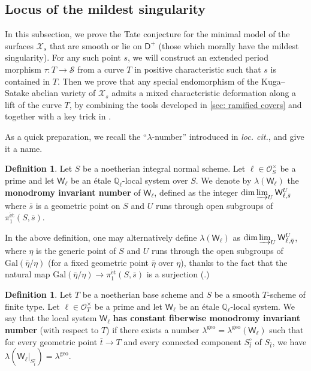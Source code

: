 \documentclass[11pt, letterpaper]{amsart}
\theoremstyle{plain}
\theoremstyle{definition}
\newtheorem{definition}[theorem]{Definition}
\newcommand{\IQ}{\mathbb{Q}}
\newcommand{\<}{\langle}
\renewcommand{\>}{\rangle}
\newcommand{\sO}{\mathcal{O}}
\newcommand{\Gal}{\mathrm{Gal}}
\newcommand{\et}{\mathrm{{\acute{e}}t}}
\newcommand{\shS}{\mathscr{S}}
\newcommand{\sfD}{\mathsf{D}}
\newcommand{\sX}{\mathcal{X}}
\newcommand{\sfW}{\mathsf{W}}
\newcommand{\geo}{{\mathrm{geo}}}
\begin{document}
\subsection{Locus of the mildest singularity}
In this subsection, we prove the Tate conjecture for the minimal model of the surfaces $\sX_s$ that are smooth or lie on $\sfD^+$ (those which morally have the mildest singularity).
For any such point $s$, we will construct an extended period morphism $\tau:T\to \shS$ from a curve $T$ in positive characteristic such that $s$ is contained in $T$.
Then we prove that any special endomorphism of the Kuga--Satake abelian variety of $\sX_s$ admits a mixed characteristic deformation along a lift of the curve $T$, by combining the tools developed in \cref{sec: ramified covers} and  together with a key trick in \cite{HYZ}.

As a quick preparation, we recall the ``$\lambda$-number'' introduced in \textit{loc. cit.}, and give it a name. 
\begin{definition}
\label{def: lambda number}
    Let $S$ be a noetherian integral normal scheme. 
    Let $\ell \in \sO_S^\times$ be a prime and let $\sfW_\ell$ be an \'etale $\IQ_\ell$-local system over $S$. 
    We denote by $\lambda(\sfW_\ell)$ the \textbf{monodromy invariant number} of $\sfW_\ell$, defined as the integer $\dim \varinjlim_U \sfW_{\ell, \bar{s}}^{U}$ where $\bar{s}$ is a geometric point on $S$ and $U$ runs through open subgroups of $\pi_1^\et(S, \bar{s})$.
\end{definition}
In the above definition, one may alternatively define $\lambda(\sfW_\ell)$ as $\dim \varinjlim_U \sfW_{\ell, \bar{\eta}}^{U}$, where $\eta$ is the generic point of $S$ and $U$ runs through the open subgroups of $\Gal(\bar{\eta}/\eta)$ (for a fixed geometric point $\bar{\eta}$ over $\eta$), thanks to the fact that the natural map $\Gal(\bar{\eta}/\eta) \to \pi_1^\et(S, \bar{s})$ is a surjection (\cite[\href{https://stacks.math.columbia.edu/tag/0BQM}{Tag 0BQM}]{stacks-project}.) 


\begin{definition}
\label{def: good compactification}
    Let $T$ be a noetherian base scheme and $S$ be a smooth $T$-scheme of finite type. 
    Let $\ell \in \sO_T^\times$ be a prime and let $\sfW_\ell$ be an \'etale $\IQ_\ell$-local system. 
    We say that the local system $\sfW_\ell$ \textbf{has constant fiberwise monodromy invariant number} (with respect to $T$) if there exists a number $\lambda^\geo=\lambda^\geo(\sfW_\ell)$ such that for every geometric point $\bar{t} \to T$ and every connected component $S^\circ_{\bar{t}}$ of $S_{\bar{t}}$, we have $\lambda(\sfW_\ell|_{S^\circ_{\bar{t}}}) = \lambda^\geo$.
\end{definition}
\end{document}
